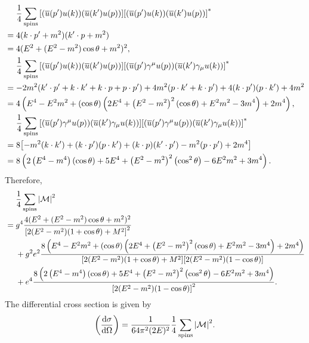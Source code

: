 \documentclass{article}
\begin{document}
\begin{align*}
    &\phantom{{}={}} \frac{1}{4} \sum_{\text{spins}} \qty[\qty(\overline{u}(p') u(k))\qty(\overline{u}(k')u(p))]\qty[\qty(\overline{u}(p') u(k))\qty(\overline{u}(k')u(p))]^* \\
    &= 4(k\cdot p' + m^2)(k'\cdot p + m^2) \\
    &= 4(E^2 + (E^2 - m^2) \cos\theta + m^2)^2, \\
    &\phantom{{}={}} \frac{1}{4} \sum_{\text{spins}} \qty[\qty(\overline{u}(p') u(k))\qty(\overline{u}(k')u(p))] \qty[\qty(\overline{u}(p')\gamma^\mu u(p))\qty(\overline{u}(k')\gamma_\mu u(k))]^* \\
    &= -2m^2(k'\cdot p' + k\cdot k' + k \cdot p + p\cdot p') + 4m^2(p\cdot k' + k\cdot p') + 4(k\cdot p')(p\cdot k') + 4m^2 \\
    &= 4 \left(E^4-E^2 m^2+( \cos \theta ) \left(2 E^4+\left(E^2-m^2\right)^2 ( \cos \theta )+E^2 m^2-3 m^4\right)+2 m^4\right), \\
    &\phantom{{}={}} \frac{1}{4} \sum_{\text{spins}} \qty[\qty(\overline{u}(p')\gamma^\mu u(p))\qty(\overline{u}(k')\gamma_\mu u(k))]\qty[\qty(\overline{u}(p')\gamma^\mu u(p))\qty(\overline{u}(k')\gamma_\mu u(k))]^* \\
    &= 8\qty[-m^2 (k\cdot k') + (k\cdot p')(p\cdot k') +(k\cdot p)(k'\cdot p') - m^2 (p\cdot p') + 2m^4] \\
    &= 8 \left(2 \left(E^4-m^4\right) (\cos \theta  )+5 E^4+\left(E^2-m^2\right)^2 \left(\cos ^2 \theta  \right)-6 E^2 m^2+3 m^4\right).
\end{align*}
Therefore,
\begin{align*}
    &\phantom{{}={}} \frac{1}{4} \sum_{\text{spins}} \abs{\mathcal{M}}^2 \\
    &= g^4 \frac{4(E^2 + (E^2 - m^2) \cos\theta + m^2)^2}{\qty[2(E^2 - m^2)(1+\cos\theta) + M^2]^2} \\
    &\phantom{{}={}} + g^2 e^2 \frac{8 \left(E^4-E^2 m^2+( \cos \theta ) \left(2 E^4+\left(E^2-m^2\right)^2 ( \cos \theta )+E^2 m^2-3 m^4\right)+2 m^4\right)}{\qty[2(E^2 - m^2)(1+\cos\theta) + M^2]\qty[2(E^2-m^2)(1-\cos\theta)]} \\
    &{\phantom{{}={}}} + e^4 \frac{8 \left(2 \left(E^4-m^4\right) (\cos \theta  )+5 E^4+\left(E^2-m^2\right)^2 \left(\cos ^2 \theta  \right)-6 E^2 m^2+3 m^4\right)}{\qty[2(E^2-m^2)(1-\cos\theta)]^2}.
\end{align*}
The differential cross section is given by
\[ \qty(\dv{\sigma}{\Omega}) = \frac{1}{64\pi^2 (2E)^2} \frac{1}{4} \sum_{\text{spins}} \abs{\mathcal{M}}^2. \]
\end{document}

